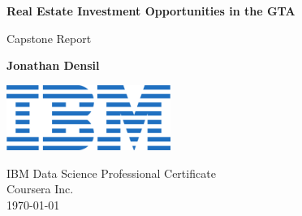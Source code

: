 \begin{titlepage}
    \begin{center}
        \vspace*{1cm}
 
        \Huge
        \textbf{Real Estate Investment Opportunities in the GTA}
 
        \vspace{0.5cm}
        \LARGE
        Capstone Report
 
        \vspace{1.5cm}
 
        \textbf{Jonathan Densil}
 
        \vfill
 
 
        \vspace{0.8cm}
 
        \includegraphics[width=0.4\textwidth]{ibm.png}
        
        \Large
        IBM Data Science Professional Certificate\\
        Coursera Inc.\\
        \today
 
    \end{center}
\end{titlepage}